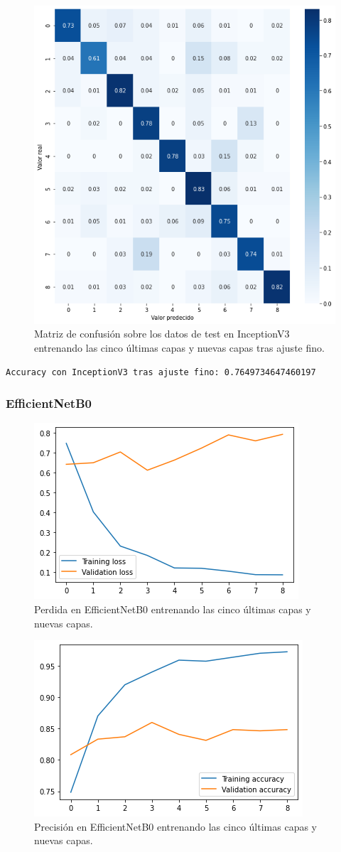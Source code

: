 \begin{figure}[H]
  \centering
  \includegraphics[width=0.5\linewidth]{Imagenes/entrenamiento_redes/5-ult/inception_5fine_matriz.png}
  \caption{Matriz de confusión sobre los datos de test en InceptionV3 entrenando las cinco últimas capas y nuevas capas tras ajuste fino.}
\end{figure}


\begin{lstlisting}
Accuracy con InceptionV3 tras ajuste fino: 0.7649734647460197
\end{lstlisting}



\subsubsection{EfficientNetB0}


\begin{figure}[H]
  \centering
  \includegraphics[width=0.5\linewidth]{Imagenes/entrenamiento_redes/5-ult/efficientnet_5ult_loss.png}
  \caption{Perdida en EfficientNetB0 entrenando las cinco últimas capas y nuevas capas.}
\end{figure}

\begin{figure}[H]
  \centering
  \includegraphics[width=0.5\linewidth]{Imagenes/entrenamiento_redes/5-ult/efficientnet_5ult_acc.png}
  \caption{Precisión en EfficientNetB0 entrenando las cinco últimas capas y nuevas capas.}
\end{figure}

